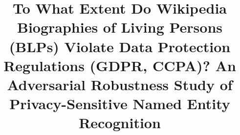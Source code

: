 \documentclass[conference]{IEEEtran}
\begin{document}
\title{To What Extent Do Wikipedia Biographies of Living Persons (BLPs) Violate Data Protection Regulations (GDPR, CCPA)? An Adversarial Robustness Study of Privacy-Sensitive Named Entity Recognition}

\author{

\vspace{1em}

}

\maketitle
\end{document}

